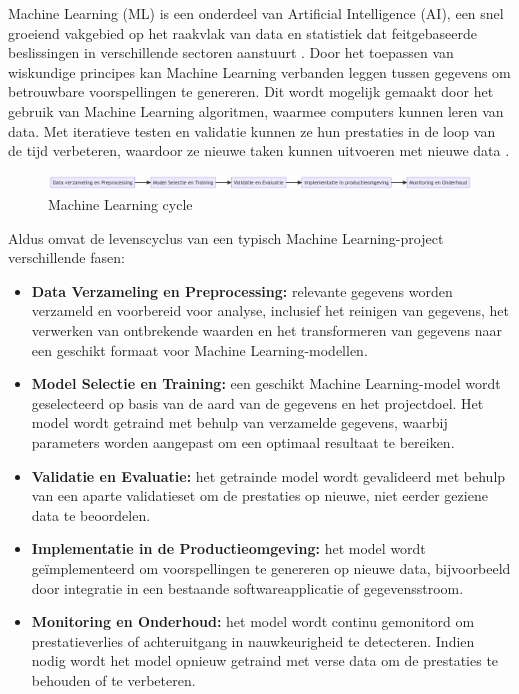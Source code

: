 Machine Learning (ML) is een onderdeel van Artificial Intelligence (AI), een snel groeiend vakgebied op het raakvlak van data en statistiek dat feitgebaseerde beslissingen in verschillende sectoren aanstuurt \autocite{Jordan2015}. Door het toepassen van wiskundige principes kan Machine Learning verbanden leggen tussen gegevens om betrouwbare voorspellingen te genereren. Dit wordt mogelijk gemaakt door het gebruik van Machine Learning algoritmen, waarmee computers kunnen leren van data. Met iteratieve testen en validatie kunnen ze hun prestaties in de loop van de tijd verbeteren, waardoor ze nieuwe taken kunnen uitvoeren met nieuwe data \autocite{Shaveta2023}.\newline

\begin{figure}[h]
    \includegraphics[width=\linewidth]{mlcycle.png}
    \caption{Machine Learning cycle}
    \label{fig:ML_cycle}
\end{figure}

Aldus \textcite{Schlegel2022} omvat de levenscyclus van een typisch Machine Learning-project verschillende fasen:

\begin{itemize}
    \item \textbf{Data Verzameling en Preprocessing:} relevante gegevens worden verzameld en voorbereid voor analyse, inclusief het reinigen van gegevens, het verwerken van ontbrekende waarden en het transformeren van gegevens naar een geschikt formaat voor Machine Learning-modellen.
    
    \item \textbf{Model Selectie en Training:} een geschikt Machine Learning-model wordt geselecteerd op basis van de aard van de gegevens en het projectdoel. Het model wordt getraind met behulp van verzamelde gegevens, waarbij parameters worden aangepast om een optimaal resultaat te bereiken.
    
    \item \textbf{Validatie en Evaluatie:} het getrainde model wordt gevalideerd met behulp van een aparte validatieset om de prestaties op nieuwe, niet eerder geziene data te beoordelen.
    
    \item \textbf{Implementatie in de Productieomgeving:} het model wordt geïmplementeerd om voorspellingen te genereren op nieuwe data, bijvoorbeeld door integratie in een bestaande softwareapplicatie of gegevensstroom.

    \item \textbf{Monitoring en Onderhoud:} het model wordt continu gemonitord om prestatieverlies of achteruitgang in nauwkeurigheid te detecteren. Indien nodig wordt het model opnieuw getraind met verse data om de prestaties te behouden of te verbeteren.
\end{itemize}


